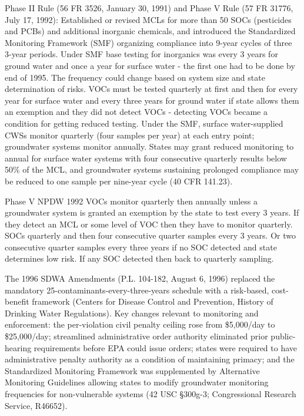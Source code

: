 Phase II Rule (56 FR 3526, January 30, 1991) and Phase V Rule (57 FR 31776, July 17, 1992): Established or revised MCLs for more than 50 SOCs (pesticides and PCBs) and additional inorganic chemicals, and introduced the Standardized Monitoring Framework (SMF) organizing compliance into 9-year cycles of three 3-year periods.
Under SMF base testing for inorganics was every 3 years for ground water and once a year for surface water - the first one had to be done by end of 1995. The frequency could change based on system size and state determination of risks. VOCs must be tested quarterly at first and then for every year for surface water and every three years for ground water if state allows them an exemption and they did not detect VOCs - detecting VOCs became a condition for getting reduced testing. Under the SMF, surface water-supplied CWSs monitor quarterly (four samples per year) at each entry point; groundwater systems monitor annually. States may grant reduced monitoring to annual for surface water systems with four consecutive quarterly results below 50\% of the MCL, and groundwater systems sustaining prolonged compliance may be reduced to one sample per nine-year cycle (40 CFR 141.23).

Phase V NPDW 1992 VOCs monitor quarterly then annually unless a groundwater system is granted an exemption by the state to test every 3 years. If they detect an MCL or some level of VOC then they have to monitor quarterly. SOCs quarterly and then four consecutive quarter samples every 3 years. Or two consecutive quarter samples every three years if no SOC detected and state determines low risk. If any SOC detected then back to quarterly sampling.


The 1996 SDWA Amendments (P.L. 104-182, August 6, 1996) replaced the mandatory 25-contaminants-every-three-years schedule with a risk-based, cost-benefit framework (Centers for Disease Control and Prevention, History of Drinking Water Regulations). Key changes relevant to monitoring and enforcement: the per-violation civil penalty ceiling rose from \$5,000/day to \$25,000/day; streamlined administrative order authority eliminated prior public-hearing requirements before EPA could issue orders; states were required to have administrative penalty authority as a condition of maintaining primacy; and the Standardized Monitoring Framework was supplemented by Alternative Monitoring Guidelines allowing states to modify groundwater monitoring frequencies for non-vulnerable systems (42 USC §300g-3; Congressional Research Service, R46652).

